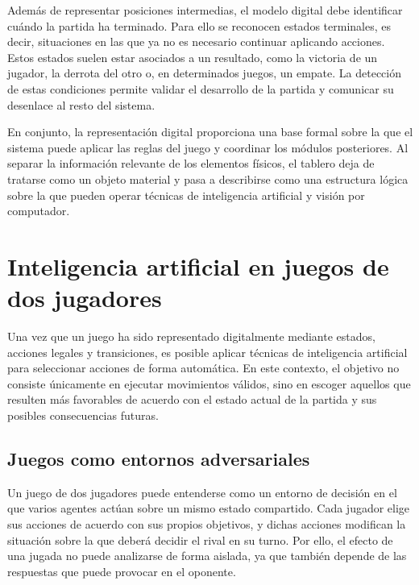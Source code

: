 Además de representar posiciones intermedias, el modelo digital debe identificar cuándo la partida ha terminado. Para ello se reconocen estados terminales, es decir, situaciones en las que ya no es necesario continuar aplicando acciones. Estos estados suelen estar asociados a un resultado, como la victoria de un jugador, la derrota del otro o, en determinados juegos, un empate. La detección de estas condiciones permite validar el desarrollo de la partida y comunicar su desenlace al resto del sistema.

En conjunto, la representación digital proporciona una base formal sobre la que el sistema puede aplicar las reglas del juego y coordinar los módulos posteriores. Al separar la información relevante de los elementos físicos, el tablero deja de tratarse como un objeto material y pasa a describirse como una estructura lógica sobre la que pueden operar técnicas de inteligencia artificial y visión por computador.


\section{Inteligencia artificial en juegos de dos jugadores}
\label{sec:inteligencia-artificial-juegos-dos-jugadores}

Una vez que un juego ha sido representado digitalmente mediante estados, acciones legales y transiciones, es posible aplicar técnicas de inteligencia artificial para seleccionar acciones de forma automática. En este contexto, el objetivo no consiste únicamente en ejecutar movimientos válidos, sino en escoger aquellos que resulten más favorables de acuerdo con el estado actual de la partida y sus posibles consecuencias futuras.

\subsection{Juegos como entornos adversariales}

Un juego de dos jugadores puede entenderse como un entorno de decisión en el que varios agentes actúan sobre un mismo estado compartido. Cada jugador elige sus acciones de acuerdo con sus propios objetivos, y dichas acciones modifican la situación sobre la que deberá decidir el rival en su turno. Por ello, el efecto de una jugada no puede analizarse de forma aislada, ya que también depende de las respuestas que puede provocar en el oponente.

